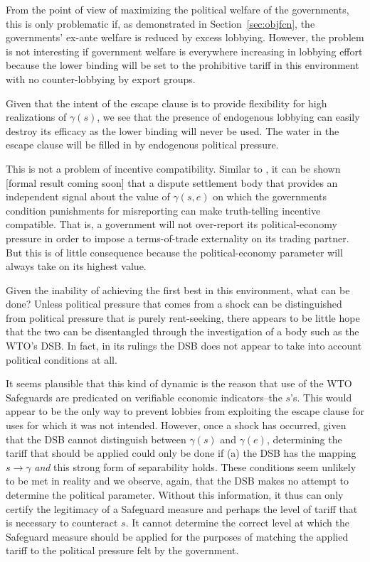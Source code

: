 \documentclass[12pt]{article}
\newcommand{\ga}{\gamma}
\begin{document}
From the point of view of maximizing the political welfare of the governments, this is only problematic if, as demonstrated in Section~\ref{sec:objfcn}, the governments' ex-ante welfare is reduced by excess lobbying. However, the problem is not interesting if government welfare is everywhere increasing in lobbying effort because the lower binding will be set to the prohibitive tariff in this environment with no counter-lobbying by export groups.

Given that the intent of the escape clause is to provide flexibility for high realizations of $\ga(s)$, we see that the presence of endogenous lobbying can easily destroy its efficacy as the lower binding will never be used. The water in the escape clause will be filled in by endogenous political pressure.

This is not a problem of incentive compatibility. Similar to \Textcite{beshkar2010b}, it can be shown [formal result coming soon] that a dispute settlement body that provides an independent signal about the value of $\ga(s,e)$ on which the governments condition punishments for misreporting can make truth-telling incentive compatible. That is, a government will not over-report its political-economy pressure in order to impose a terms-of-trade externality on its trading partner. But this is of little consequence because the political-economy parameter will always take on its highest value.

Given the inability of achieving the first best in this environment, what can be done? Unless political pressure that comes from a shock can be distinguished from political pressure that is purely rent-seeking, there appears to be little hope that the two can be disentangled through the investigation of a body such as the WTO's DSB. In fact, in its rulings the DSB does not appear to take into account political conditions at all.

It seems plausible that this kind of dynamic is the reason that use of the WTO Safeguards are predicated on verifiable economic indicators--the $s$'s. This would appear to be the only way to prevent lobbies from exploiting the escape clause for uses for which it was not intended. However, once a shock has occurred, given that the DSB cannot distinguish between $\ga(s)$ and $\ga(e)$, determining the tariff that should be applied could only be done if (a) the DSB has the mapping $s \rightarrow \ga$ \textit{and} this strong form of separability holds. These conditions seem unlikely to be met in reality and we observe, again, that the DSB makes no attempt to determine the political parameter. Without this information, it thus can only certify the legitimacy of a Safeguard measure and perhaps the level of tariff that is necessary to counteract $s$. It cannot determine the correct level at which the Safeguard measure should be applied for the purposes of matching the applied tariff to the political pressure felt by the government.
\end{document}
